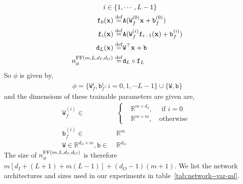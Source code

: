 \begin{align}
    i\in\{1,&\cdots, L-1\}\\
    \mathtt f_{0}(\mathbf x) \stackrel{\rm def}{=}& \mathtt A(\mathtt W_f^{(0)}\mathbf x + \mathtt b_f^{(0)})\\
    \mathtt f_{i}(\mathbf x) \stackrel{\rm def}{=}& \mathtt A(\mathtt W_f^{(i)}\mathtt f_{i-1}(\mathbf x) + \mathtt b_f^{(i)})\\
    \mathtt d_L(\mathbf x)\stackrel{\rm def}{=}&\mathtt W^\top\mathbf x + \mathtt b\\
    n^{{\rm FF}(m, L, d_I, d_O)}_\phi \stackrel{\rm def}{=}& \mathtt d_L\circ \mathtt f_L\label{eq:def-FF--var-ml} 
\end{align}
So $\phi$ is given by,
\begin{align}
    \phi=\{\mathtt W^{i}_f, \mathtt b^{i}_f:i=0,1,\cdots L-1\}\cup\{\mathtt W, \mathtt b\}
\end{align}
and the dimensions of these trainable parameters are given are,
\begin{align}
   \mathtt W_f^{(i)} \in&\;\begin{cases}
   &\mathbb R^{m\times d_I},\quad\text{ if }i=0\\
   &\mathbb R^{m\times m},\quad\text{otherwise }\end{cases}\\
   \mathtt b_f^{(i)}\in&\;\mathbb R^m\\
   \mathtt W\in\mathbb R^{d_O\times m}, \mathtt b\in&\;\mathbb R^{d_O}
\end{align}
The size of $n^{{\rm FF}(m, L, d_I, d_O)}_\phi$ is therefore $m[d_I + (L+1) + m(L-1)]+(d_O-1)(m+1)$. 
We list the network architectures and sizes used in our experiments in table~\ref{tab:network--var-ml}.
